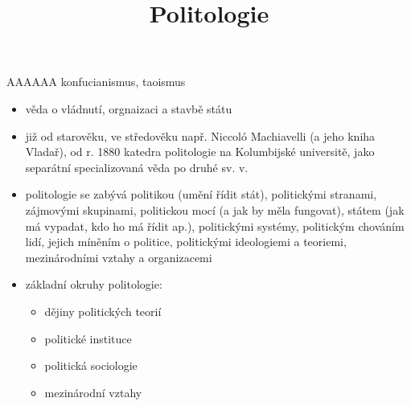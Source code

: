 \documentclass{article}
\title{\vspace{-2cm}Politologie\vspace{-1.7cm}}
\date{}
\author{}
\begin{document}
\maketitle

AAAAAA konfucianismus, taoismus

\begin{itemize}
  \item věda o vládnutí, orgnaizaci a stavbě státu
  \item již od starověku, ve středověku např. Niccoló Machiavelli (a jeho kniha Vladař), od r. 1880 katedra politologie na Kolumbijské universitě, jako separátní specializovaná věda po druhé sv. v.
  \item politologie se zabývá politikou (umění řídit stát), politickými stranami, zájmovými skupinami, politickou mocí (a jak by měla fungovat), státem (jak má vypadat, kdo ho má řídit ap.), politickými systémy, politickým chováním lidí, jejich míněním o politice, politickými ideologiemi a teoriemi, mezinárodními vztahy a organizacemi
  \item základní okruhy politologie:
  \begin{itemize}
    \item dějiny politických teorií
    \item politické instituce
    \item politická sociologie
    \item mezinárodní vztahy
  \end{itemize}
\end{itemize}
\end{document}
